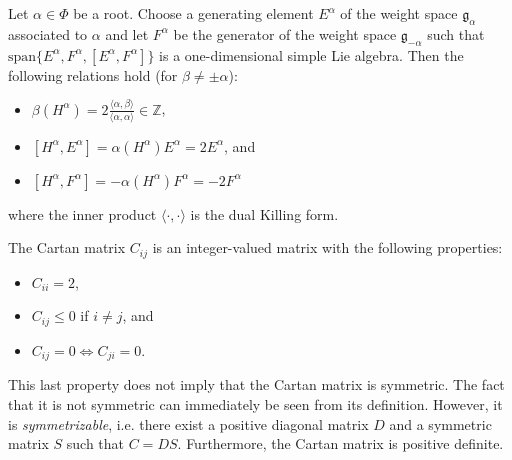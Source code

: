     \begin{property}
        Let $\alpha\in\Phi$ be a root. Choose a generating element $E^\alpha$ of the weight space $\mathfrak{g}_\alpha$ associated to $\alpha$ and let $F^\alpha$ be the generator of the weight space $\mathfrak{g}_{-\alpha}$ such that $\text{span}\{E^\alpha,F^\alpha,[E^\alpha,F^\alpha]\}$ is a one-dimensional simple Lie algebra. Then the following relations hold (for $\beta\neq\pm\alpha$):
        \begin{itemize}
            \item $\beta(H^\alpha) = 2\frac{\langle\alpha, \beta\rangle}{\langle\alpha, \alpha\rangle}\in\mathbb{Z}$,
            \item $[H^\alpha,E^\alpha] = \alpha(H^\alpha)E^\alpha = 2E^\alpha$, and
            \item $[H^\alpha,F^\alpha] = -\alpha(H^\alpha)F^\alpha = -2F^\alpha$
        \end{itemize}
        where the inner product $\langle\cdot,\cdot\rangle$ is the dual Killing form.
    \end{property}

    \begin{property}\label{lie:cartan_prop}
        The Cartan matrix $C_{ij}$ is an integer-valued matrix with the following properties:
        \begin{itemize}
            \item $C_{ii}=2$,
            \item $C_{ij}\leq0$ if $i\neq j$, and
            \item $C_{ij}=0\iff C_{ji}=0$.
        \end{itemize}
        This last property does not imply that the Cartan matrix is symmetric. The fact that it is not symmetric can immediately be seen from its definition. However, it is \textit{symmetrizable}, i.e. there exist a positive diagonal matrix $D$ and a symmetric matrix $S$ such that $C=DS$. Furthermore, the Cartan matrix is positive definite.
    \end{property}

